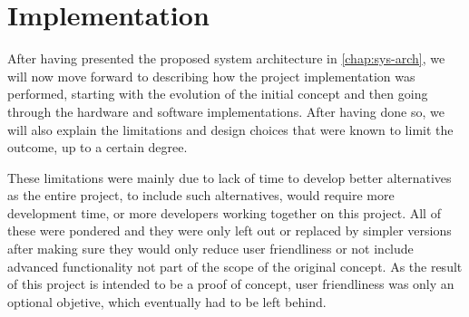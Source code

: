 \chapter{Implementation} \label{chap:impl}

After having presented the proposed system architecture in \autoref{chap:sys-arch}, we will now move forward to describing how the project implementation was performed, starting with the evolution of the initial concept and then going through the hardware and software implementations.
After having done so, we will also explain the limitations and design choices that were known to limit the outcome, up to a certain degree.

These limitations were mainly due to lack of time to develop better alternatives as the entire project, to include such alternatives, would require more development time, or more developers working together on this project.
All of these were pondered and they were only left out or replaced by simpler versions after making sure they would only reduce user friendliness or not include advanced functionality not part of the scope of the original concept.
As the result of this project is intended to be a proof of concept, user friendliness was only an optional objetive, which eventually had to be left behind.










